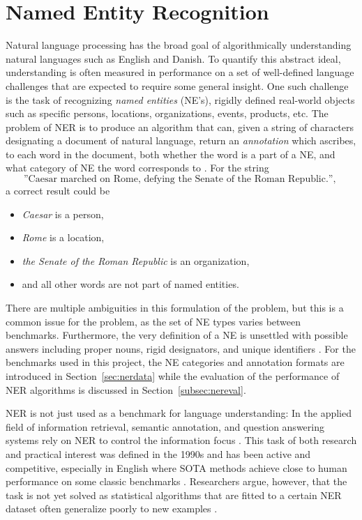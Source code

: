 \documentclass[main.tex]{subfiles}
\begin{document}
\section{Named Entity Recognition}
Natural language processing has the broad goal of algorithmically understanding natural languages such as English and Danish.
To quantify this abstract ideal, understanding is often measured in performance on a set of well-defined language challenges that are expected to require some general insight.
One such challenge is the task of recognizing \emph{named entities} (NE's), rigidly defined real-world objects such as specific persons, locations, organizations, events, products, etc.
The problem of NER is to produce an algorithm that can, given a string of characters designating a document of natural language, return an \emph{annotation} which ascribes, to each word in the document, both whether the word is a part of a NE, and what category of NE the word corresponds to \cite{wiki2021ner}.
For the string
\[
    \text{
        ''Caesar marched on Rome, defying the Senate of the Roman Republic.'',
    }
\]
a correct result could be
\begin{itemize}
    \item \emph{Caesar} is a person,
    \item \emph{Rome} is a location,
    \item \emph{the Senate of the Roman Republic} is an organization,
    \item and all other words are not part of named entities.
\end{itemize}
There are multiple ambiguities in this formulation of the problem, but this is a common issue for the problem, as the set of NE types varies between benchmarks.
Furthermore, the very definition of a NE is unsettled with possible answers including proper nouns, rigid designators, and unique identifiers \cite[Sec. 4]{marrero2013ner}.
For the benchmarks used in this project, the NE categories and annotation formats are introduced in Section~\ref{sec:nerdata} while the evaluation of the performance of NER algorithms is discussed in Section~\ref{subsec:nereval}.

NER is not just used as a benchmark for language understanding:
In the applied field of information retrieval, semantic annotation, and question answering systems rely on NER to control the information focus \cite[Sec. 2]{marrero2013ner}.
This task of both research and practical interest was defined in the 1990s and has been active and competitive, especially in English where SOTA methods achieve close to human performance on some classic benchmarks \cite{wiki2021ner, marrero2013ner}.
Researchers argue, however, that the task is not yet solved as statistical algorithms that are fitted to a certain NER dataset often generalize poorly to new examples \cite[Sec. 7.2]{marrero2013ner}.
\end{document}
